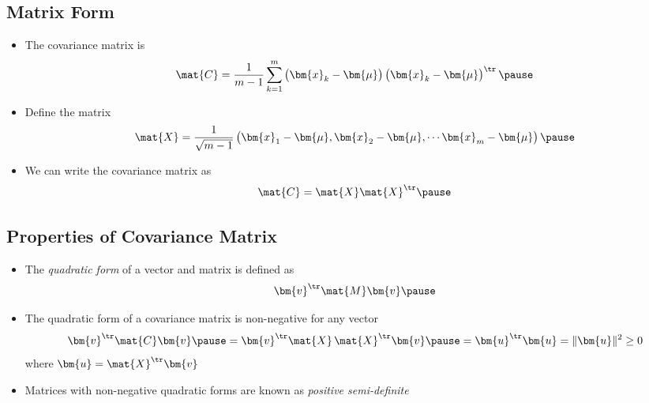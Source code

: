 \begin{slide}
\section{Matrix Form}

\begin{PauseHighLight}

\begin{itemize}
\item The covariance matrix is
  \begin{displaymath}
    \mat{C} = \frac{1}{m-1} \sum_{k=1}^m \left(\strut
    \bm{x}_k-\bm{\mu}\right) \left(\strut
    \bm{x}_k-\bm{\mu}\right)^\tr\pause 
  \end{displaymath}
\item Define the matrix
  \begin{displaymath}
    \mat{X} = \frac{1}{\sqrt{m-1}}\left( \strut \bm{x}_1-\bm{\mu},
    \bm{x}_2-\bm{\mu}, \cdots \bm{x}_m-\bm{\mu} \right)\pause
  \end{displaymath}
\item We can write the covariance matrix as
  \begin{displaymath}
    \mat{C} =  \mat{X} \mat{X}^\tr\pause
  \end{displaymath}
\end{itemize}

\end{PauseHighLight}
\end{slide}


\begin{slide}
\section{Properties of Covariance Matrix}

\begin{PauseHighLight}

\begin{itemize}
\item The \emph{quadratic form} of a vector and matrix is defined as
  \begin{displaymath}
    \bm{v}^\tr \mat{M} \bm{v}\pause
  \end{displaymath}
\item The quadratic form of a covariance matrix is non-negative for any
  vector\pause
  \begin{displaymath}
    \bm{v}^\tr \mat{C} \bm{v} \pause = \bm{v}^\tr \mat{X} \, \mat{X}^\tr
    \bm{v} \pause = \bm{u}^\tr \bm{u} = \| \bm{u} \|^2 \geq 0
  \end{displaymath}
  where $\bm{u} = \mat{X}^\tr \bm{v}$\pause
\item Matrices with non-negative quadratic forms are known as \emph{positive
    semi-definite}\pause
\end{itemize}

\end{PauseHighLight}
\end{slide}



